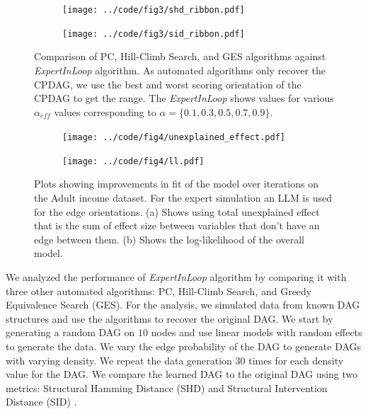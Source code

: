 \documentclass{uai2025} %
\begin{document}
\begin{figure}[t!]
	\centering
	\begin{subfigure}{0.5\textwidth}
		\centering
		\texttt{[image: ../code/fig3/shd\_ribbon.pdf]}
		\caption{}
	\end{subfigure}
	\begin{subfigure}{0.5\textwidth}
		\centering
		\texttt{[image: ../code/fig3/sid\_ribbon.pdf]}
		\caption{}
	\end{subfigure}
	\caption{Comparison of PC, Hill-Climb Search, and GES algorithms against
		\textit{ExpertInLoop} algorithm. As automated algorithms only recover
		the CPDAG, we use the best and worst scoring orientation of the CPDAG 
		to get the range. The \textit{ExpertInLoop} shows values for various
		$ \alpha_{\textit{eff}} $ values corresponding to $ \alpha = \{0.1, 0.3, 0.5, 0.7, 0.9\} $.}
	\label{fig:shd_sid}
\end{figure}

\begin{figure}[t!]
	\begin{subfigure}{0.25\textwidth}
		\centering
		\texttt{[image: ../code/fig4/unexplained\_effect.pdf]}
		\caption{}
	\end{subfigure}%
	\begin{subfigure}{0.25\textwidth}
		\centering
		\texttt{[image: ../code/fig4/ll.pdf]}
		\caption{}
	\end{subfigure}
	\caption{Plots showing improvements in fit of the model over iterations
	on the Adult income dataset. For the expert simulation an LLM is used
	for the edge orientations. (a) Shows using total unexplained effect that is the
	sum of effect size between variables that don't have an edge between them. (b)
	Shows the log-likelihood of the overall model.
	}
	\label{fig:unexplained_ll}
\end{figure}

We analyzed the performance of \textit{ExpertInLoop} algorithm by comparing it
with three other automated algorithms: PC, Hill-Climb Search, and Greedy
Equivalence Search (GES). For the analysis, we simulated data from known DAG
structures and use the algorithms to recover the original DAG. We start by
generating a random DAG on $10$ nodes and use linear models with random effects
to generate the data. We vary the edge probability of the DAG to generate DAGs
with varying density. We repeat the data generation $30$ times for each density
value for the DAG. We compare the learned DAG to the original DAG using two
metrics: Structural Hamming Distance (SHD) and Structural Intervention Distance
(SID) \citep{Peters2015}.
\end{document}
